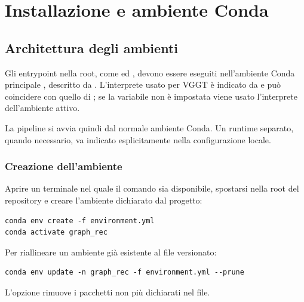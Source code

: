 \chapter{Installazione e ambiente Conda}
\label{chap:conda}

\section{Architettura degli ambienti}

Gli entrypoint nella root, come  ed
, devono essere eseguiti nell'ambiente Conda principale
, descritto da . L'interprete usato
per VGGT è indicato da  e può coincidere con quello
di ; se la variabile non è impostata viene usato l'interprete
dell'ambiente attivo.

La pipeline si avvia quindi dal normale ambiente Conda. Un runtime separato,
quando necessario, va indicato esplicitamente nella configurazione locale.


\subsection{Creazione dell'ambiente}

Aprire un terminale nel quale il comando  sia disponibile,
spostarsi nella root del repository e creare l'ambiente dichiarato dal progetto:

\begin{lstlisting}[language={}]
conda env create -f environment.yml
conda activate graph_rec
\end{lstlisting}

Per riallineare un ambiente già esistente al file versionato:

\begin{lstlisting}[language={}]
conda env update -n graph_rec -f environment.yml --prune
\end{lstlisting}

L'opzione  rimuove i pacchetti non più dichiarati nel file.


